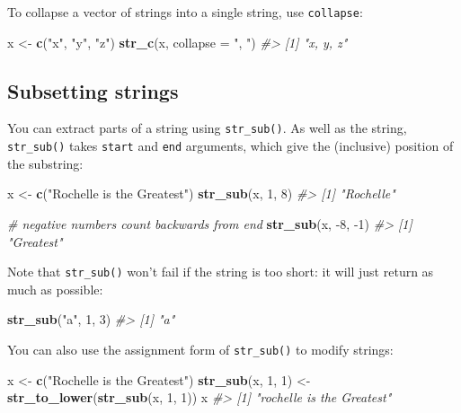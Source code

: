 \documentclass[]{book}
\newenvironment{Shaded}{\begin{snugshade}}{\end{snugshade}}
\newcommand{\CommentTok}[1]{\textcolor[rgb]{0.56,0.35,0.01}{\textit{#1}}}
\newcommand{\DataTypeTok}[1]{\textcolor[rgb]{0.13,0.29,0.53}{#1}}
\newcommand{\DecValTok}[1]{\textcolor[rgb]{0.00,0.00,0.81}{#1}}
\newcommand{\KeywordTok}[1]{\textcolor[rgb]{0.13,0.29,0.53}{\textbf{#1}}}
\newcommand{\NormalTok}[1]{#1}
\newcommand{\StringTok}[1]{\textcolor[rgb]{0.31,0.60,0.02}{#1}}
\begin{document}
To collapse a vector of strings into a single string, use \texttt{collapse}:

\begin{Shaded}
\begin{Highlighting}[]
\NormalTok{x <-}\StringTok{ }\KeywordTok{c}\NormalTok{(}\StringTok{"x"}\NormalTok{, }\StringTok{"y"}\NormalTok{, }\StringTok{"z"}\NormalTok{)}
\KeywordTok{str_c}\NormalTok{(x, }\DataTypeTok{collapse =} \StringTok{", "}\NormalTok{)}
\CommentTok{#> [1] "x, y, z"}
\end{Highlighting}
\end{Shaded}

\hypertarget{subsetting-strings}{%
\subsection{Subsetting strings}\label{subsetting-strings}}

You can extract parts of a string using \texttt{str\_sub()}. As well as the string, \texttt{str\_sub()} takes \texttt{start} and \texttt{end} arguments, which give the (inclusive) position of the substring:

\begin{Shaded}
\begin{Highlighting}[]
\NormalTok{x <-}\StringTok{ }\KeywordTok{c}\NormalTok{(}\StringTok{"Rochelle is the Greatest"}\NormalTok{)}
\KeywordTok{str_sub}\NormalTok{(x, }\DecValTok{1}\NormalTok{, }\DecValTok{8}\NormalTok{)}
\CommentTok{#> [1] "Rochelle"}

\CommentTok{# negative numbers count backwards from end}
\KeywordTok{str_sub}\NormalTok{(x, }\DecValTok{-8}\NormalTok{, }\DecValTok{-1}\NormalTok{)}
\CommentTok{#> [1] "Greatest"}
\end{Highlighting}
\end{Shaded}

Note that \texttt{str\_sub()} won't fail if the string is too short: it will just return as much as possible:

\begin{Shaded}
\begin{Highlighting}[]
\KeywordTok{str_sub}\NormalTok{(}\StringTok{"a"}\NormalTok{, }\DecValTok{1}\NormalTok{, }\DecValTok{3}\NormalTok{)}
\CommentTok{#> [1] "a"}
\end{Highlighting}
\end{Shaded}

You can also use the assignment form of \texttt{str\_sub()} to modify strings:

\begin{Shaded}
\begin{Highlighting}[]
\NormalTok{x <-}\StringTok{ }\KeywordTok{c}\NormalTok{(}\StringTok{"Rochelle is the Greatest"}\NormalTok{)}
\KeywordTok{str_sub}\NormalTok{(x, }\DecValTok{1}\NormalTok{, }\DecValTok{1}\NormalTok{) <-}\StringTok{ }\KeywordTok{str_to_lower}\NormalTok{(}\KeywordTok{str_sub}\NormalTok{(x, }\DecValTok{1}\NormalTok{, }\DecValTok{1}\NormalTok{))}
\NormalTok{x}
\CommentTok{#> [1] "rochelle is the Greatest"}
\end{Highlighting}
\end{Shaded}
\end{document}

